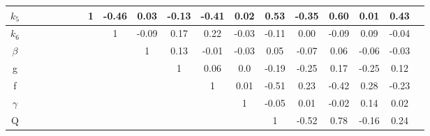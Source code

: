 \begin{table}[p]
{\begin{minipage}{24.4cm}
\begin{tabular}{|c|c|c|c|c|c|c|c|c|c|c|c|c|c|c|c|c|c|c|}
\cellcolor{dark-gray}$k_5$ & \cellcolor{light-gray} & \cellcolor{light-gray} & \cellcolor{light-gray} & \cellcolor{light-gray} & \cellcolor{light-gray} & \cellcolor{light-gray} & \cellcolor{light-gray}1 & \cellcolor{orange}-0.46 & 0.03 & -0.13 & \cellcolor{orange}-0.41 & 0.02 & \cellcolor{orange}0.53 & \cellcolor{orange}-0.35 & \cellcolor{orange}0.60 & 0.01 & \cellcolor{orange}0.43\\ \hline
\cellcolor{dark-gray}$k_6$ & \cellcolor{light-gray} & \cellcolor{light-gray} & \cellcolor{light-gray} & \cellcolor{light-gray} & \cellcolor{light-gray} & \cellcolor{light-gray} & \cellcolor{light-gray} & \cellcolor{light-gray}1 & -0.09 & 0.17 & 0.22 & -0.03 & -0.11 & 0.00 & -0.09 & 0.09 & -0.04\\ \hline
\cellcolor{dark-gray}$\beta$ & \cellcolor{light-gray} & \cellcolor{light-gray} & \cellcolor{light-gray} & \cellcolor{light-gray} & \cellcolor{light-gray} & \cellcolor{light-gray} & \cellcolor{light-gray} & \cellcolor{light-gray} & \cellcolor{light-gray}1 & 0.13 & -0.01 & -0.03 & 0.05 & -0.07 & 0.06 & -0.06 & -0.03\\ \hline
\cellcolor{dark-gray}g & \cellcolor{light-gray} & \cellcolor{light-gray} & \cellcolor{light-gray} & \cellcolor{light-gray} & \cellcolor{light-gray} & \cellcolor{light-gray} & \cellcolor{light-gray} & \cellcolor{light-gray} & \cellcolor{light-gray} & \cellcolor{light-gray}1 & 0.06 & 0.0 & -0.19 & -0.25 & 0.17 & -0.25 & 0.12\\ \hline
\cellcolor{dark-gray}f & \cellcolor{light-gray} & \cellcolor{light-gray} & \cellcolor{light-gray} & \cellcolor{light-gray} & \cellcolor{light-gray} & \cellcolor{light-gray} & \cellcolor{light-gray} & \cellcolor{light-gray} & \cellcolor{light-gray} & \cellcolor{light-gray} & \cellcolor{light-gray}1 & 0.01 & \cellcolor{orange}-0.51 & 0.23 & \cellcolor{orange}-0.42 & 0.28 & -0.23\\ \hline
\cellcolor{dark-gray}$\gamma$ & \cellcolor{light-gray} & \cellcolor{light-gray} & \cellcolor{light-gray} & \cellcolor{light-gray} & \cellcolor{light-gray} & \cellcolor{light-gray} & \cellcolor{light-gray} & \cellcolor{light-gray} & \cellcolor{light-gray} & \cellcolor{light-gray} & \cellcolor{light-gray} & \cellcolor{light-gray}1 & -0.05 & 0.01 & -0.02 & 0.14 & 0.02\\ \hline
\cellcolor{dark-gray}Q & \cellcolor{light-gray} & \cellcolor{light-gray} & \cellcolor{light-gray} & \cellcolor{light-gray} & \cellcolor{light-gray} & \cellcolor{light-gray} & \cellcolor{light-gray} & \cellcolor{light-gray} & \cellcolor{light-gray} & \cellcolor{light-gray} & \cellcolor{light-gray} & \cellcolor{light-gray} & \cellcolor{light-gray}1 & \cellcolor{orange}-0.52 & \cellcolor{orange}0.78 & -0.16 & 0.24\\ \hline

\end{tabular}
\end{minipage}}
\end{table}
